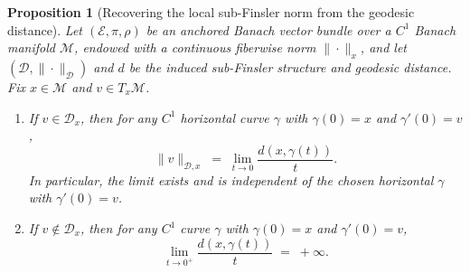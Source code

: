 \documentclass[12pt]{amsart}
\numberwithin{equation}{section}
\newtheorem{proposition}{Proposition}[section]
\theoremstyle{remark}
\begin{document}
\begin{proposition}[Recovering the local sub-Finsler norm from the geodesic distance]
\label{prop:local_gauge_from_distance}
Let $(\mathcal E,\pi,\rho)$ be an anchored Banach vector bundle over a $C^1$ Banach manifold $\mathcal M$, endowed with a continuous fiberwise norm $\|\cdot\|_{x}$, and let $(\mathcal D,\|\cdot\|_{\mathcal D})$ and $d$ be the induced sub-Finsler structure and geodesic distance. Fix $x\in\mathcal M$ and $v\in T_x\mathcal M$.
\begin{enumerate}
\item If $v\in \mathcal D_x$, then for any $C^1$ \emph{horizontal} curve $\gamma$ with $\gamma(0)=x$ and $\gamma'(0)=v$,
\begin{equation}
\|v\|_{\mathcal D,x} \;=\; \lim_{t\to 0}\frac{d(x,\gamma(t))}{t}.
\end{equation}
In particular, the limit exists and is independent of the chosen horizontal $\gamma$ with $\gamma'(0)=v$.

\item If $v\notin \mathcal D_x$, then for any $C^1$ curve $\gamma$ with $\gamma(0)=x$ and $\gamma'(0)=v$,
\begin{equation}
\lim_{t\to 0^+}\frac{d(x,\gamma(t))}{t} \;=\; +\infty.
\end{equation}
\end{enumerate}
\end{proposition}
\end{document}
